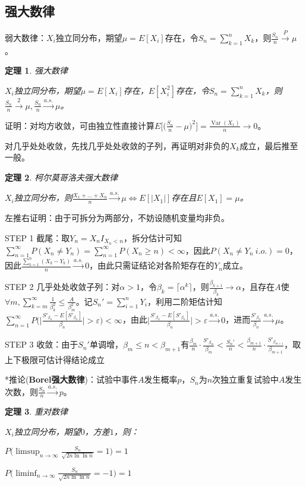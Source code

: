 \documentclass[a4paper,UTF8,fontset=windows]{ctexart}
\newtheorem{thm}{定理}[section]
\DeclareMathOperator{\Var}{Var}
\newcommand{\con}[1]{\stackrel{#1}{\longrightarrow}}
\begin{document}
\subsection{强大数律}
弱大数律：$X_i$独立同分布，期望$\mu=E[X_i]$存在，令$S_n=\sum_{k=1}^nX_k$，则$\frac{S_n}{n}\con{P}\mu$。

\begin{thm} 强大数律

$X_i$独立同分布，期望$\mu=E[X_i]$存在，$E[X_i^2]$存在，令$S_n=\sum_{k=1}^nX_k$，则$\frac{S_n}{n}\con{2}\mu,\frac{S_n}{n}\con{a.s.}\mu$。
\end{thm}

证明：对均方收敛，可由独立性直接计算$E\bigg[\bigg(\frac{S_n}{n}-\mu\bigg)^2\bigg]=\frac{\Var(X_1)}{n}\con{}0$。

对几乎处处收敛，先找几乎处处收敛的子列，再证明对非负的$X_k$成立，最后推至一般。

\begin{thm} \emph{柯尔莫哥洛夫强大数律}

$X_i$独立同分布，则$\frac{X_1+\dots+X_n}{n}\con{a.s.}\mu\Leftrightarrow E[|X_1|]$存在且$E[X_1]=\mu$。
\end{thm}

左推右证明：由于可拆分为两部分，不妨设随机变量均非负。

\qquad STEP 1 截尾：取$Y_n=X_nI_{X_n<n}$，拆分估计可知$\sum_{n=1}^\infty P(X_n\ne Y_n)=\sum_{n=1}^\infty P(X_n\ge n)<\infty$，因此$P(X_n\ne Y_n\ i.o.)=0$，因此$\frac{\sum_{k=1}^n(X_k-Y_k)}{n}\con{a.s.}0$，由此只需证结论对各阶矩存在的$Y_n$成立。

\qquad STEP 2 几乎处处收敛子列：对$\alpha>1$，令$\beta_k=\lceil\alpha^k\rceil$，则$\frac{\beta_{k+1}}{\beta_k}\con{}\alpha$，且存在$A$使$\forall m,\sum_{k=m}^\infty\frac{1}{\beta_k^2}\le\frac{A}{\beta_m^2}$。记$S_n'=\sum_{i=1}^nY_i$，利用二阶矩估计知$\sum_{n=1}^\infty P\bigg(\bigg|\frac{S'_{\beta_n}-E[S'_{\beta_n}]}{\beta_n}\bigg|>\varepsilon\bigg)<\infty$，由此$\bigg|\frac{S'_{\beta_n}-E[S'_{\beta_n}]}{\beta_n}\bigg|>\varepsilon\con{a.s.}0$，进而$\frac{S'_{\beta_n}}{\beta_n}\con{a.s.}\mu$。

\qquad STEP 3 收敛：由于$S_n'$单调增，$\beta_m\le n<\beta_{m+1}$有$\frac{\beta_m}{n}\cdot\frac{S'_{\beta_m}}{\beta_m}<\frac{S_n'}{n}<\frac{\beta_{m+1}}{n}\cdot\frac{S'_{\beta_{m+1}}}{\beta_{m+1}}$，取上下极限可估计得结论成立

*推论(\textbf{Borel强大数律})：试验中事件$A$发生概率$p$，$S_n$为$n$次独立重复试验中$A$发生次数，则$\frac{S_n}{n}\con{a.s.}p$。

\begin{thm} 重对数律

$X_i$独立同分布，期望$0$，方差$1$，则：

$P\bigg(\limsup_{n\to\infty}\frac{S_n}{\sqrt{2n\ln\ln n}}=1\bigg)=1$

$P\bigg(\liminf_{n\to\infty}\frac{S_n}{\sqrt{2n\ln\ln n}}=-1\bigg)=1$
\end{thm}
\end{document}
